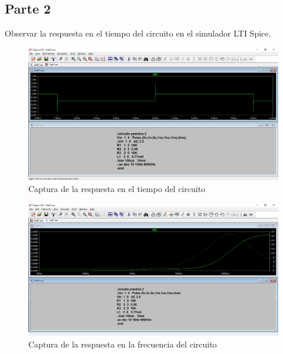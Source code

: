 \documentclass[letterpaper,10pt]{article}
\begin{document}
\subsection{Parte 2} 
\textbullet Observar la respuesta en el tiempo del circuito en el simulador LTI Spice.
\begin{figure}[h!]
	\centering
	\includegraphics[width=0.8\linewidth]{respuesta_en_escalon_1}
	\caption{Captura de la respuesta en el tiempo del circuito}
	\label{fig:respuestaenescalon1}
\end{figure}
\FloatBarrier
\begin{figure}[h!]
	\centering
	\includegraphics[width=0.8\linewidth]{Bode_sim}
	\caption{Captura de la respuesta en la frecuencia del circuito}
	\label{fig:bode}
\end{figure}
\FloatBarrier
\end{document}
